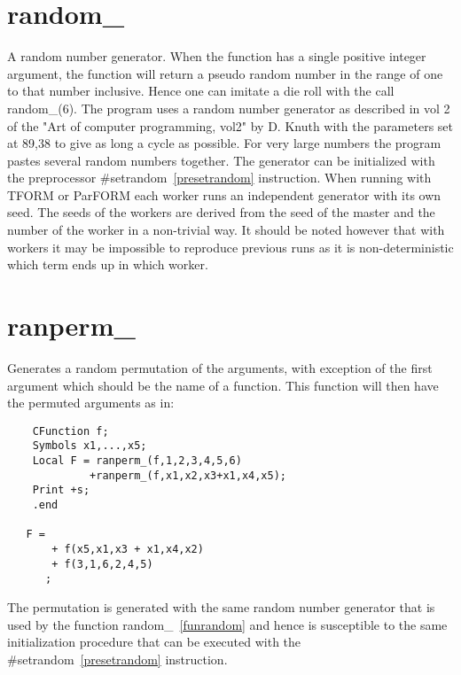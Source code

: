 
\section{random\_}
\label{funrandom}
\noindent A random number generator. When the function has a single 
positive integer argument, the function will return a pseudo random number 
in the range of one to that number inclusive. Hence one can imitate a die 
roll with the call random\_(6). The program uses a random number generator 
as described in vol 2 of the "Art of computer programming, vol2" by D. 
Knuth with the parameters set at 89,38 to give as long a cycle as possible. 
For very large numbers the program pastes several random numbers together. 
The generator can be initialized with the preprocessor 
\#setrandom~\ref{presetrandom} instruction. When running 
with TFORM or ParFORM each worker runs an independent generator with its 
own seed. The seeds of the workers are derived from the seed of the master 
and the number of the worker in a non-trivial way. It should be noted 
however that with workers it may be impossible to reproduce previous runs 
as it is non-deterministic which term ends up in which worker.


\section{ranperm\_}
\label{funranperm}
\noindent Generates a random permutation of the arguments, with exception 
of the first argument which should be the name of a function. This function 
will then have the permuted arguments as in:
\begin{verbatim}
    CFunction f;
    Symbols x1,...,x5;
    Local F = ranperm_(f,1,2,3,4,5,6)
             +ranperm_(f,x1,x2,x3+x1,x4,x5);
    Print +s;
    .end

   F =
       + f(x5,x1,x3 + x1,x4,x2)
       + f(3,1,6,2,4,5)
      ;
\end{verbatim}
The permutation is generated with the same random number generator that is 
used by the function 
random\_~\ref{funrandom} and hence 
is susceptible to the same initialization procedure that can be executed 
with the \#setrandom~\ref{presetrandom} instruction.

